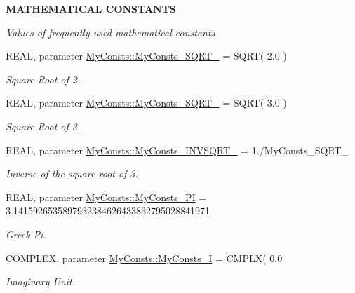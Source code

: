 \begin{Indent}{\bf MATHEMATICAL CONSTANTS}\par
{\em \label{_amgrp84277d81319af617f28dca6319eed8fe}
Values of frequently used mathematical constants }\begin{DoxyCompactItemize}
\item 
REAL, parameter \hyperlink{namespace_my_consts_a6e68542f43fce6ab1f7e252239b4a25b}{MyConsts::MyConsts\_\-SQRT\_} = SQRT( 2.0 )
\begin{DoxyCompactList}\small\item\em Square Root of 2. \item\end{DoxyCompactList}\item 
REAL, parameter \hyperlink{namespace_my_consts_a929edc066c350d2da103fc05a425cf82}{MyConsts::MyConsts\_\-SQRT\_} = SQRT( 3.0 )
\begin{DoxyCompactList}\small\item\em Square Root of 3. \item\end{DoxyCompactList}\item 
REAL, parameter \hyperlink{namespace_my_consts_af9c57a57cecb201806c7ab5d3095ee96}{MyConsts::MyConsts\_\-INVSQRT\_} = 1./MyConsts\_\-SQRT\_
\begin{DoxyCompactList}\small\item\em Inverse of the square root of 3. \item\end{DoxyCompactList}\item 
REAL, parameter \hyperlink{namespace_my_consts_a269bb97656a3220bb770f00b1a25bf4c}{MyConsts::MyConsts\_\-PI} = 3.1415926535897932384626433832795028841971
\begin{DoxyCompactList}\small\item\em Greek Pi. \item\end{DoxyCompactList}\item 
COMPLEX, parameter \hyperlink{namespace_my_consts_ac8a82909a7db530fcc275af18b798094}{MyConsts::MyConsts\_\-I} = CMPLX( 0.0
\begin{DoxyCompactList}\small\item\em Imaginary Unit. \item\end{DoxyCompactList}\end{DoxyCompactItemize}
\end{Indent}

